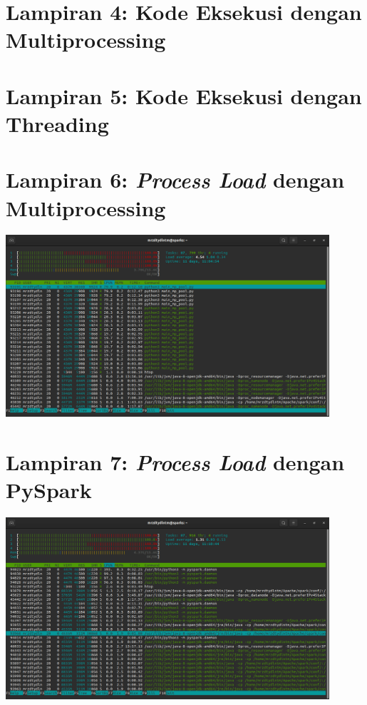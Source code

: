 \documentclass[12pt,a4paper]{report}
\begin{document}
\section*{Lampiran 4: Kode Eksekusi dengan Multiprocessing}


\section*{Lampiran 5: Kode Eksekusi dengan Threading}


\section*{Lampiran 6: \textit{Process Load} dengan Multiprocessing}
\begin{center}
	\includegraphics[width=12cm]{gambar/mp_pool.png}
\end{center}

\section*{Lampiran 7: \textit{Process Load} dengan PySpark}
\begin{center}
	\includegraphics[width=12cm]{gambar/spark-submit.png}
\end{center}
\end{document}
